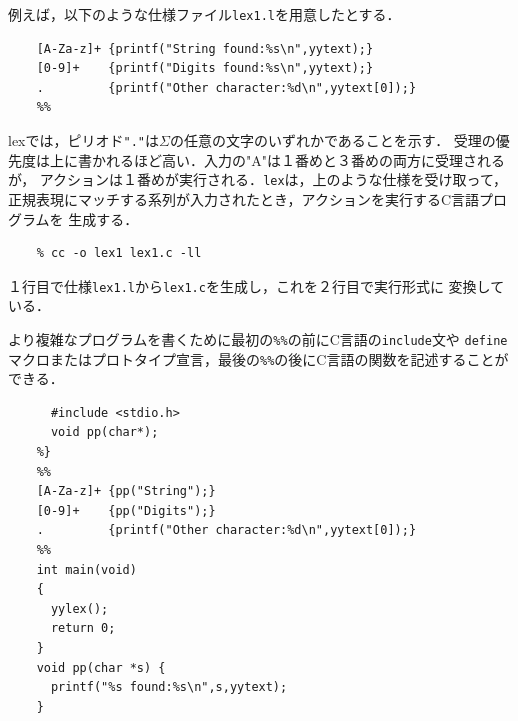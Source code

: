 \documentclass[dvipdfmx,a4j]{jbook}
\begin{document}
  例えば，以下のような仕様ファイル\texttt{lex1.l}を用意したとする．

  \begin{Verbatim}[frame=single]
    %%
    [A-Za-z]+ {printf("String found:%s\n",yytext);}
    [0-9]+    {printf("Digits found:%s\n",yytext);}
    .         {printf("Other character:%d\n",yytext[0]);}
    %%
  \end{Verbatim}

  lexでは，ピリオド\texttt{"."}は$\Sigma$の任意の文字のいずれかであることを示す．
  受理の優先度は上に書かれるほど高い．入力の"A"は１番めと３番めの両方に受理されるが，
  アクションは１番めが実行される．\texttt{lex}は，上のような仕様を受け取って，
  正規表現にマッチする系列が入力されたとき，アクションを実行するC言語プログラムを
  生成する．

  \begin{Verbatim}[frame=single]
    % lex -o lex1.c lex1.l
    % cc -o lex1 lex1.c -ll
  \end{Verbatim}


  １行目で仕様\texttt{lex1.l}から\texttt{lex1.c}を生成し，これを２行目で実行形式に
  変換している．

  より複雑なプログラムを書くために最初の\verb|%%|の前にC言語の\texttt{include}文や
  \texttt{define}マクロまたはプロトタイプ宣言，最後の\verb|%%|の後にC言語の関数を記述することができる．

  \begin{Verbatim}[frame=single]
    %{
      #include <stdio.h>
      void pp(char*);
    %}
    %%
    [A-Za-z]+ {pp("String");}
    [0-9]+    {pp("Digits");}
    .         {printf("Other character:%d\n",yytext[0]);}
    %%
    int main(void)
    {
      yylex();
      return 0;
    }
    void pp(char *s) {
      printf("%s found:%s\n",s,yytext);
    }
  \end{Verbatim}




\end{document}
